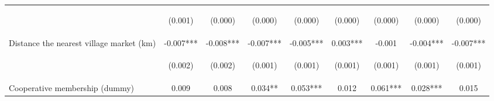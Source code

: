 \begin{center}
\begin{tabular}{lcccccccc}
\vspace{4pt} & \begin{footnotesize}(0.001)\end{footnotesize} & \begin{footnotesize}(0.000)\end{footnotesize} & \begin{footnotesize}(0.000)\end{footnotesize} & \begin{footnotesize}(0.000)\end{footnotesize} & \begin{footnotesize}(0.000)\end{footnotesize} & \begin{footnotesize}(0.000)\end{footnotesize} & \begin{footnotesize}(0.000)\end{footnotesize} & \begin{footnotesize}(0.000)\end{footnotesize} \\
Distance the nearest village market (km) & -0.007*** & -0.008*** & -0.007*** & -0.005*** & 0.003*** & -0.001 & -0.004*** & -0.007*** \\
\vspace{4pt} & \begin{footnotesize}(0.002)\end{footnotesize} & \begin{footnotesize}(0.002)\end{footnotesize} & \begin{footnotesize}(0.001)\end{footnotesize} & \begin{footnotesize}(0.001)\end{footnotesize} & \begin{footnotesize}(0.001)\end{footnotesize} & \begin{footnotesize}(0.001)\end{footnotesize} & \begin{footnotesize}(0.001)\end{footnotesize} & \begin{footnotesize}(0.001)\end{footnotesize} \\
Cooperative membership (dummy) & 0.009 & 0.008 & 0.034** & 0.053*** & 0.012 & 0.061*** & 0.028*** & 0.015 \\

\end{tabular}
\end{center}
